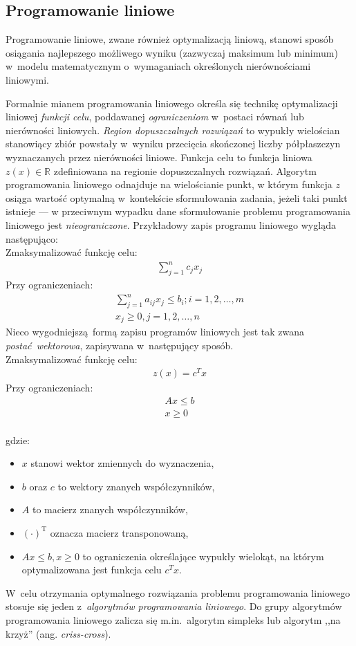 \subsection{Programowanie liniowe}\label{ss_lp}
\par{
  Programowanie liniowe, zwane również optymalizacją liniową, stanowi sposób
  osiągania najlepszego możliwego wyniku (zazwyczaj maksimum lub minimum) w~modelu 
  matematycznym o~wymaganiach określonych nierównościami liniowymi.
}
\par{
  Formalnie mianem programowania liniowego określa się technikę optymalizacji liniowej \emph{funkcji celu}, poddawanej \emph{ograniczeniom} w~postaci równań lub nierówności liniowych.
  \emph{Region dopuszczalnych rozwiązań} to wypukły wielościan stanowiący zbiór powstały w~wyniku przecięcia skończonej liczby półpłaszczyn wyznaczanych przez nierówności liniowe.
  Funkcja celu to funkcja liniowa $z(x) \in \mathbb{R}$ zdefiniowana na regionie dopuszczalnych rozwiązań.
  Algorytm programowania liniowego odnajduje na wielościanie punkt, w którym funkcja $z$ osiąga wartość optymalną w~kontekście sformułowania zadania, jeżeli taki punkt istnieje --- w przeciwnym wypadku dane sformułowanie problemu programowania liniowego jest \emph{nieograniczone}.
  Przykładowy zapis programu liniowego wygląda następująco:\\
  Zmaksymalizować funkcję celu:
  \begin{align*}
    \sum_{j=1}^{n} c_j x_j
  \end{align*}
  Przy ograniczeniach: \begin{align*}
    \sum_{j=1}^{n}a_{ij}x_j \leq b_i; i =1, 2, \ldots, m\\
    x_j \geq 0, j=1, 2, \ldots, n
  \end{align*}
  Nieco wygodniejszą~formą zapisu programów liniowych jest tak zwana \emph{postać~wektorowa}, zapisywana w~następujący sposób.\\
  Zmaksymalizować funkcję celu:
  \begin{align*}
    z(x)={c^T}x
  \end{align*}
  Przy ograniczeniach: \begin{align*}
    Ax \leq b\\
    x\geq 0
  \end{align*}\\
  gdzie:
  \begin{itemize}
    \item $x$ stanowi wektor zmiennych do wyznaczenia,
    \item $b$ oraz $c$ to wektory znanych współczynników,
    \item $A$ to macierz znanych współczynników,
    \item ${(\cdot)}^\mathrm{T}$ oznacza macierz transponowaną,
    \item $Ax \leq b, x\geq 0$ to ograniczenia określające wypukły wielokąt,
      na którym optymalizowana jest funkcja celu $c^{T}x$.
  \end{itemize}
  W~celu otrzymania optymalnego rozwiązania problemu programowania liniowego
  stosuje się jeden z~\emph{algorytmów programowania liniowego}.
  Do grupy algorytmów programowania liniowego zalicza się m.in.\ algorytm
  simpleks lub algorytm ,,na krzyż'' (ang. \emph{criss-cross}).
}
